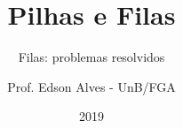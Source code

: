 \title{Pilhas e Filas}
\subtitle{Filas: problemas resolvidos}
\author{Prof. Edson Alves - UnB/FGA}
\date{2019}

